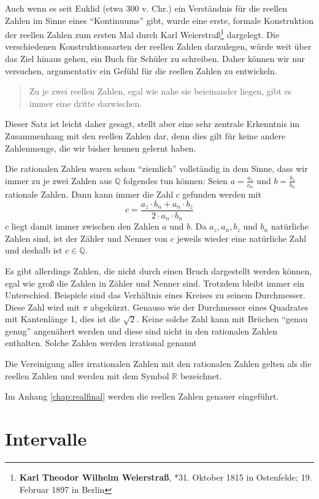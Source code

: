 Auch wenn es seit Euklid (etwa 300 v. Chr.) ein Verständnis für die reellen Zahlen im Sinne eines "`Kontinuums"' gibt, wurde eine erste, formale Konstruktion der reellen Zahlen zum ersten Mal durch Karl Weierstraß\footnote{\textbf{Karl Theodor Wilhelm Weierstraß}, *31. Oktober 1815 in Ostenfelde; 19. Februar 1897 in Berlin} dargelegt. Die verschiedenen Konstruktionsarten der reellen Zahlen darzulegen, würde weit über das Ziel hinaus gehen, ein Buch für Schüler zu schreiben. Daher können wir nur versuchen, argumentativ ein Gefühl für die reellen Zahlen zu entwickeln. 
\begin{quote}
Zu je zwei reellen Zahlen, egal wie nahe sie beieinander liegen, gibt es immer eine dritte dazwischen.
\end{quote}
Dieser Satz ist leicht daher gesagt, stellt aber eine sehr zentrale Erkenntnis im Zusammenhang mit den reellen Zahlen dar, denn dies gilt für keine andere Zahlenmenge, die wir bisher kennen gelernt haben.

Die rationalen Zahlen waren schon "`ziemlich"' vollständig in dem Sinne, dass wir immer zu je zwei Zahlen aus $\mathbb{Q}$ folgendes tun können: Seien $a=\frac{a_z}{a_n}$ und $b=\frac{b_z}{b_n}$ rationale Zahlen. Dann kann immer die Zahl $c$ gefunden werden mit
\[
c = \frac{a_z\cdot b_n + a_n\cdot b_z}{2\cdot a_n\cdot b_n}
\]
$c$ liegt damit immer zwischen den Zahlen $a$ und $b$. Da $a_z,a_n,b_z$ und $b_n$ natürliche Zahlen sind, ist der Zähler und Nenner von $c$ jeweils wieder eine natürliche Zahl und deshalb ist $c\in \mathbb{Q}$. 

Es gibt allerdings Zahlen, die nicht durch einen Bruch dargestellt werden können, egal wie groß die Zahlen in Zähler und Nenner sind. Trotzdem bleibt immer ein Unterschied. Beispiele sind das Verhältnis eines Kreises zu seinem Durchmesser. Diese Zahl wird mit $\pi$ abgekürzt. Genauso wie der Durchmesser eines Quadrates mit Kantenlänge 1, dies ist die $\sqrt{2}$. Keine solche Zahl kann mit Brüchen "`genau genug"' angenähert werden und diese sind nicht in den rationalen Zahlen enthalten. Solche Zahlen werden irrational genannt

Die Vereinigung aller irrationalen Zahlen mit den rationalen Zahlen gelten als die reellen Zahlen und werden mit dem Symbol $\mathbb{R}$ bezeichnet.

Im Anhang \ref{chap:realfinal} werden die reellen Zahlen genauer eingeführt. 

\section{Intervalle}

